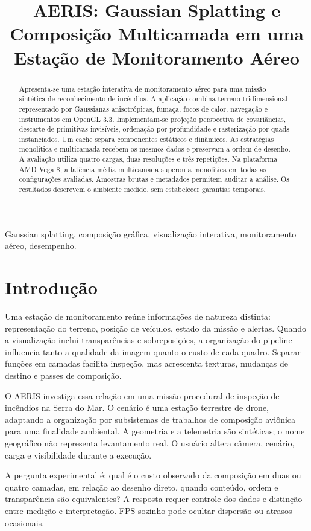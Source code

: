 \documentclass[conference]{IEEEtran}
\title{AERIS: Gaussian Splatting e Composição Multicamada em uma Estação de Monitoramento Aéreo}
\author{\IEEEauthorblockN{Matheus Della Rosa e Guilherme Marolla Tesch}
\IEEEauthorblockA{Engenharia de Computação --- Computação Gráfica e Visualização Científica\\
RA 113209 \qquad RA 113800}}
\begin{document}
\maketitle
\begin{abstract}
Apresenta-se uma estação interativa de monitoramento aéreo para uma missão sintética de reconhecimento de incêndios. A aplicação combina terreno tridimensional representado por Gaussianas anisotrópicas, fumaça, focos de calor, navegação e instrumentos em OpenGL 3.3. Implementam-se projeção perspectiva de covariâncias, descarte de primitivas invisíveis, ordenação por profundidade e rasterização por quads instanciados. Um cache separa componentes estáticos e dinâmicos. As estratégias monolítica e multicamada recebem os mesmos dados e preservam a ordem de desenho. A avaliação utiliza quatro cargas, duas resoluções e três repetições. Na plataforma AMD Vega 8, a latência média multicamada superou a monolítica em todas as configurações avaliadas. Amostras brutas e metadados permitem auditar a análise. Os resultados descrevem o ambiente medido, sem estabelecer garantias temporais.
\end{abstract}
\begin{IEEEkeywords}
Gaussian splatting, composição gráfica, visualização interativa, monitoramento aéreo, desempenho.
\end{IEEEkeywords}

\section{Introdução}
Uma estação de monitoramento reúne informações de natureza distinta: representação do terreno, posição de veículos, estado da missão e alertas. Quando a visualização inclui transparências e sobreposições, a organização do pipeline influencia tanto a qualidade da imagem quanto o custo de cada quadro. Separar funções em camadas facilita inspeção, mas acrescenta texturas, mudanças de destino e passes de composição.

O AERIS investiga essa relação em uma missão procedural de inspeção de incêndios na Serra do Mar. O cenário é uma estação terrestre de drone, adaptando a organização por subsistemas de trabalhos de composição aviônica para uma finalidade ambiental. A geometria e a telemetria são sintéticas; o nome geográfico não representa levantamento real. O usuário altera câmera, cenário, carga e visibilidade durante a execução.

A pergunta experimental é: qual é o custo observado da composição em duas ou quatro camadas, em relação ao desenho direto, quando conteúdo, ordem e transparência são equivalentes? A resposta requer controle dos dados e distinção entre medição e interpretação. FPS sozinho pode ocultar dispersão ou atrasos ocasionais.
\end{document}
